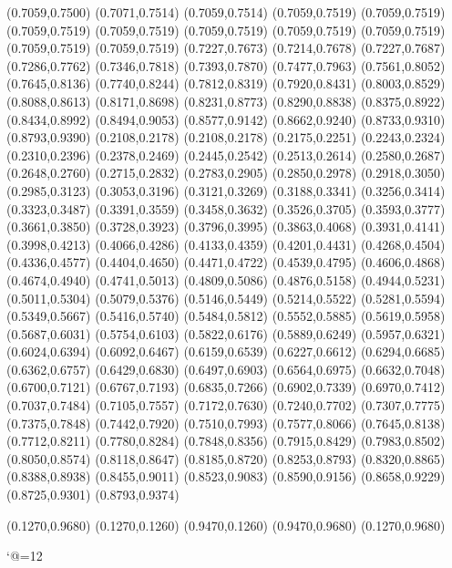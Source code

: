 \PST@Diamond(0.7059,0.7500)
\PST@Diamond(0.7071,0.7514)
\PST@Diamond(0.7059,0.7514)
\PST@Diamond(0.7059,0.7519)
\PST@Diamond(0.7059,0.7519)
\PST@Diamond(0.7059,0.7519)
\PST@Diamond(0.7059,0.7519)
\PST@Diamond(0.7059,0.7519)
\PST@Diamond(0.7059,0.7519)
\PST@Diamond(0.7059,0.7519)
\PST@Diamond(0.7059,0.7519)
\PST@Diamond(0.7059,0.7519)
\PST@Diamond(0.7227,0.7673)
\PST@Diamond(0.7214,0.7678)
\PST@Diamond(0.7227,0.7687)
\PST@Diamond(0.7286,0.7762)
\PST@Diamond(0.7346,0.7818)
\PST@Diamond(0.7393,0.7870)
\PST@Diamond(0.7477,0.7963)
\PST@Diamond(0.7561,0.8052)
\PST@Diamond(0.7645,0.8136)
\PST@Diamond(0.7740,0.8244)
\PST@Diamond(0.7812,0.8319)
\PST@Diamond(0.7920,0.8431)
\PST@Diamond(0.8003,0.8529)
\PST@Diamond(0.8088,0.8613)
\PST@Diamond(0.8171,0.8698)
\PST@Diamond(0.8231,0.8773)
\PST@Diamond(0.8290,0.8838)
\PST@Diamond(0.8375,0.8922)
\PST@Diamond(0.8434,0.8992)
\PST@Diamond(0.8494,0.9053)
\PST@Diamond(0.8577,0.9142)
\PST@Diamond(0.8662,0.9240)
\PST@Diamond(0.8733,0.9310)
\PST@Diamond(0.8793,0.9390)
\PST@Dashed(0.2108,0.2178)
(0.2108,0.2178)
(0.2175,0.2251)
(0.2243,0.2324)
(0.2310,0.2396)
(0.2378,0.2469)
(0.2445,0.2542)
(0.2513,0.2614)
(0.2580,0.2687)
(0.2648,0.2760)
(0.2715,0.2832)
(0.2783,0.2905)
(0.2850,0.2978)
(0.2918,0.3050)
(0.2985,0.3123)
(0.3053,0.3196)
(0.3121,0.3269)
(0.3188,0.3341)
(0.3256,0.3414)
(0.3323,0.3487)
(0.3391,0.3559)
(0.3458,0.3632)
(0.3526,0.3705)
(0.3593,0.3777)
(0.3661,0.3850)
(0.3728,0.3923)
(0.3796,0.3995)
(0.3863,0.4068)
(0.3931,0.4141)
(0.3998,0.4213)
(0.4066,0.4286)
(0.4133,0.4359)
(0.4201,0.4431)
(0.4268,0.4504)
(0.4336,0.4577)
(0.4404,0.4650)
(0.4471,0.4722)
(0.4539,0.4795)
(0.4606,0.4868)
(0.4674,0.4940)
(0.4741,0.5013)
(0.4809,0.5086)
(0.4876,0.5158)
(0.4944,0.5231)
(0.5011,0.5304)
(0.5079,0.5376)
(0.5146,0.5449)
(0.5214,0.5522)
(0.5281,0.5594)
(0.5349,0.5667)
(0.5416,0.5740)
(0.5484,0.5812)
(0.5552,0.5885)
(0.5619,0.5958)
(0.5687,0.6031)
(0.5754,0.6103)
(0.5822,0.6176)
(0.5889,0.6249)
(0.5957,0.6321)
(0.6024,0.6394)
(0.6092,0.6467)
(0.6159,0.6539)
(0.6227,0.6612)
(0.6294,0.6685)
(0.6362,0.6757)
(0.6429,0.6830)
(0.6497,0.6903)
(0.6564,0.6975)
(0.6632,0.7048)
(0.6700,0.7121)
(0.6767,0.7193)
(0.6835,0.7266)
(0.6902,0.7339)
(0.6970,0.7412)
(0.7037,0.7484)
(0.7105,0.7557)
(0.7172,0.7630)
(0.7240,0.7702)
(0.7307,0.7775)
(0.7375,0.7848)
(0.7442,0.7920)
(0.7510,0.7993)
(0.7577,0.8066)
(0.7645,0.8138)
(0.7712,0.8211)
(0.7780,0.8284)
(0.7848,0.8356)
(0.7915,0.8429)
(0.7983,0.8502)
(0.8050,0.8574)
(0.8118,0.8647)
(0.8185,0.8720)
(0.8253,0.8793)
(0.8320,0.8865)
(0.8388,0.8938)
(0.8455,0.9011)
(0.8523,0.9083)
(0.8590,0.9156)
(0.8658,0.9229)
(0.8725,0.9301)
(0.8793,0.9374)

\PST@Border(0.1270,0.9680)
(0.1270,0.1260)
(0.9470,0.1260)
(0.9470,0.9680)
(0.1270,0.9680)

\catcode`@=12
\fi
\endpspicture
